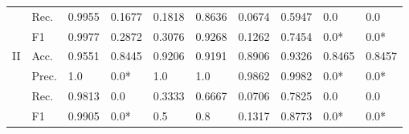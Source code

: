 \begin{tabular}{clllllllll}
                                      & Rec.                                                 & 0.9955                  & 0.1677                  & 0.1818                       & 0.8636                  & 0.0674                                                                       & 0.5947                                                                      & 0.0                                       & 0.0                                       \\
                                      & F1                                                   & 0.9977                  & 0.2872                  & 0.3076                       & 0.9268                  & 0.1262                                                                       & 0.7454                                                                      & 0.0*                                      & 0.0*                                      \\ 
    \midrule
    \multirow{4}{*}{II}               & Acc.                                                 & 0.9551                  & 0.8445                  & 0.9206                       & 0.9191                  & 0.8906                                                                       & 0.9326                                                                      & 0.8465                                    & 0.8457                                    \\
                                      & Prec.                                                & 1.0                     & 0.0*                    & 1.0                          & 1.0                     & 0.9862                                                                       & 0.9982                                                                      & 0.0*                                      & 0.0*                                      \\
                                      & Rec.                                                 & 0.9813                  & 0.0                     & 0.3333                       & 0.6667                  & 0.0706                                                                       & 0.7825                                                                      & 0.0                                       & 0.0                                       \\
                                      & F1                                                   & 0.9905                  & 0.0*                    & 0.5                          & 0.8                     & 0.1317                                                                       & 0.8773                                                                      & 0.0*                                      & 0.0*                                      \\ 

\end{tabular}

